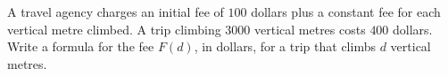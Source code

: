 A travel agency charges an initial fee of $100$ dollars plus a constant fee for each vertical metre climbed. A trip climbing $3000$ vertical metres costs $400$ dollars. Write a formula for the fee $F(d)$, in dollars, for a trip that climbs $d$ vertical metres.
